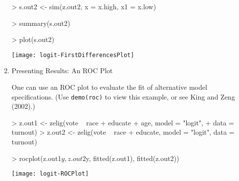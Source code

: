 \begin{enumerate}
\begin{Schunk}
\begin{Sinput}
>  s.out2 <- sim(z.out2, x = x.high, x1 = x.low)
\end{Sinput}
\end{Schunk}
\begin{Schunk}
\begin{Sinput}
>  summary(s.out2)
\end{Sinput}
\end{Schunk}
\begin{center}
\begin{Schunk}
\begin{Sinput}
>  plot(s.out2)
\end{Sinput}
\end{Schunk}
\texttt{[image: logit-FirstDifferencesPlot]}
\end{center} 


\item {Presenting Results: An ROC Plot}  \label{ROC}
  
  One can use an ROC plot to evaluate the fit of alternative model
  specifications.  (Use {\tt demo(roc)} to view this example, or see
  King and Zeng (2002)\nocite{KinZen02}.)  
\begin{Schunk}
\begin{Sinput}
>  z.out1 <- zelig(vote ~ race + educate + age, model = "logit", 
+                   data = turnout)
>  z.out2 <- zelig(vote ~ race + educate, model = "logit", data = turnout)
\end{Sinput}
\end{Schunk}
\begin{center}
\begin{Schunk}
\begin{Sinput}
> rocplot(z.out1$y, z.out2$y, fitted(z.out1), fitted(z.out2))
\end{Sinput}
\end{Schunk}
\texttt{[image: logit-ROCPlot]}
\end{center}
\end{enumerate}

